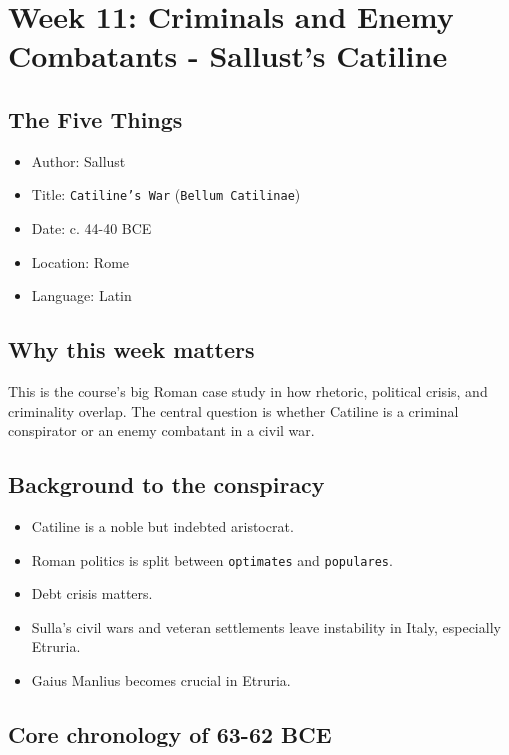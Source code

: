 \documentclass[11pt]{article}
\begin{document}
\section{Week 11: Criminals and Enemy Combatants - Sallust's Catiline}

\subsection{The Five Things}

\begin{itemize}
\item Author: Sallust
\item Title: \texttt{Catiline's War} (\texttt{Bellum Catilinae})
\item Date: c. 44-40 BCE
\item Location: Rome
\item Language: Latin
\end{itemize}

\subsection{Why this week matters}

This is the course's big Roman case study in how rhetoric, political crisis, and criminality overlap. The central question is whether Catiline is a criminal conspirator or an enemy combatant in a civil war.

\subsection{Background to the conspiracy}

\begin{itemize}
\item Catiline is a noble but indebted aristocrat.
\item Roman politics is split between \texttt{optimates} and \texttt{populares}.
\item Debt crisis matters.
\item Sulla's civil wars and veteran settlements leave instability in Italy, especially Etruria.
\item Gaius Manlius becomes crucial in Etruria.
\end{itemize}

\subsection{Core chronology of 63-62 BCE}
\end{document}
